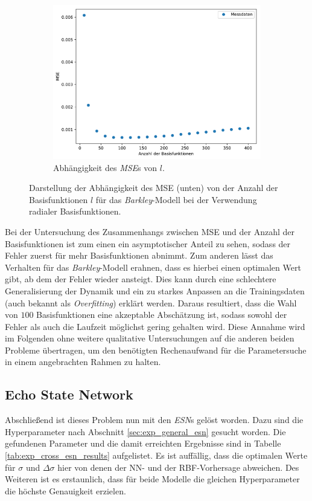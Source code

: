 \begin{figure}[h]
	\centering
	\begin{subfigure}{\textwidth}
		\centering
		\includegraphics[width=4.2in]{figures/results/cross_prediction/rbf_placements_uv_mse.pdf}
  		\caption{Abhängigkeit des \textit{MSE}s von $l$.}
	\end{subfigure}%
	
	\caption{Darstellung der Abhängigkeit des MSE (unten) von der Anzahl der Basisfunktionen $l$ für das \textit{Barkley}-Modell bei der Verwendung radialer Basisfunktionen.}
	\label{fig:exp_cross_rbf_placements_mse_barkley}
\end{figure}

Bei der Untersuchung des Zusammenhangs zwischen MSE und der Anzahl der Basisfunktionen ist zum einen ein asymptotischer Anteil zu sehen, sodass der Fehler zuerst für mehr Basisfunktionen abnimmt. Zum anderen lässt das Verhalten für das \textit{Barkley}-Modell erahnen, dass es hierbei einen optimalen Wert gibt, ab dem der Fehler wieder ansteigt. Dies kann durch eine schlechtere Generalisierung der Dynamik und ein zu starkes Anpassen an die Trainingsdaten (auch bekannt als \textit{Overfitting}) erklärt werden. Daraus resultiert, dass die Wahl von $100$ Basisfunktionen eine akzeptable Abschätzung ist, sodass sowohl der Fehler als auch die Laufzeit möglichst gering gehalten wird. Diese Annahme wird im Folgenden ohne weitere qualitative Untersuchungen auf die anderen beiden Probleme übertragen, um den benötigten Rechenaufwand für die Parametersuche in einem angebrachten Rahmen zu halten.  

\FloatBarrier
\subsection{Echo State Network}
Abschließend ist dieses Problem nun mit den \textit{ESN}s gelöst worden. Dazu sind die Hyperparameter nach Abschnitt \ref{sec:exp_general_esn} gesucht worden. Die gefundenen Parameter und die damit erreichten Ergebnisse sind in Tabelle \ref{tab:exp_cross_esn_results} aufgelistet. Es ist auffällig, dass die optimalen Werte für $\sigma$ und $\Delta \sigma$ hier von denen der NN- und der RBF-Vorhersage abweichen. Des Weiteren ist es erstaunlich, dass für beide Modelle die gleichen Hyperparameter die höchste Genauigkeit erzielen. \\

